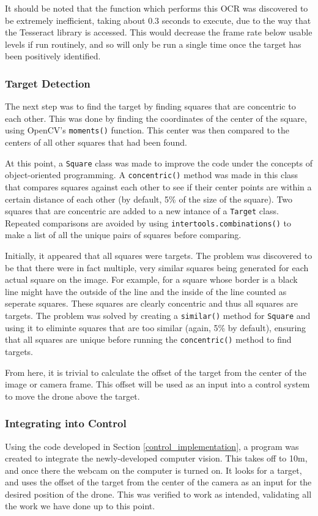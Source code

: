 \documentclass[11pt]{article}
\begin{document}
It should be noted that the function which performs this OCR was discovered to be extremely inefficient, taking about 0.3 seconds to execute, due to the way that the Tesseract library is accessed. This would decrease the frame rate below usable levels if run routinely, and so will only be run a single time once the target has been positively identified.

\subsubsection{Target Detection}
The next step was to find the target by finding squares that are concentric to each other. This was done by finding the coordinates of the center of the square, using OpenCV's \lstinline|moments()| function. This center was then compared to the centers of all other squares that had been found.

At this point, a \lstinline|Square| class was made to improve the code under the concepts of object-oriented programming. A \lstinline|concentric()| method was made in this class that compares squares against each other to see if their center points are within a certain distance of each other (by default, 5\% of the size of the square). Two squares that are concentric are added to a new intance of a \lstinline|Target| class. Repeated comparisons are avoided by using \lstinline|intertools.combinations()| to make a list of all the unique pairs of squares before comparing.

Initially, it appeared that all squares were targets. The problem was discovered to be that there were in fact multiple, very similar squares being generated for each actual square on the image. For example, for a square whose border is a black line might have the outside of the line and the inside of the line counted as seperate squares. These squares are clearly concentric and thus all squares are targets. The problem was solved by creating a \lstinline|similar()| method for \lstinline|Square| and using it to eliminte squares that are too similar (again, 5\% by default), ensuring that all squares are unique before running the \lstinline|concentric()| method to find targets.

From here, it is trivial to calculate the offset of the target from the center of the image or camera frame. This offset will be used as an input into a control system to move the drone above the target.

\subsubsection{Integrating into Control}
Using the code developed in Section \ref{control_implementation}, a program was created to integrate the newly-developed computer vision. This takes off to 10m, and once there the webcam on the computer is turned on. It looks for a target, and uses the offset of the target from the center of the camera as an input for the desired position of the drone. This was verified to work as intended, validating all the work we have done up to this point.
\end{document}

